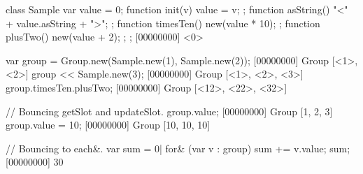 \begin{urbiscript}
class Sample
{
  var value = 0;
  function init(v) { value = v; };
  function asString() { "<" + value.asString + ">"; };
  function timesTen() { new(value * 10); };
  function plusTwo()  { new(value + 2); };
};
[00000000] <0>

var group = Group.new(Sample.new(1), Sample.new(2));
[00000000] Group [<1>, <2>]
group << Sample.new(3);
[00000000] Group [<1>, <2>, <3>]
group.timesTen.plusTwo;
[00000000] Group [<12>, <22>, <32>]

// Bouncing getSlot and updateSlot.
group.value;
[00000000] Group [1, 2, 3]
group.value = 10;
[00000000] Group [10, 10, 10]

// Bouncing to each&.
var sum = 0|
for& (var v : group)
  sum += v.value;
sum;
[00000000] 30
\end{urbiscript}

